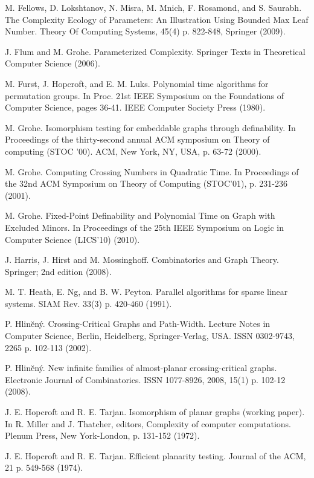 \documentclass[11pt]{report}
\begin{document}
\begin{thebibliography}{9}
M. Fellows, D. Lokshtanov, N. Misra, M. Mnich, F. Rosamond, and S. Saurabh. The Complexity Ecology of Parameters: An Illustration Using Bounded Max Leaf Number. Theory Of Computing Systems, 45(4) p. 822-848, Springer (2009).

J. Flum and M. Grohe. Parameterized Complexity. Springer Texts in Theoretical Computer Science (2006).

M. Furst, J. Hopcroft, and E. M. Luks. Polynomial time algorithms for permutation groups. In Proc. 21st IEEE Symposium on the Foundations of Computer Science, pages 36-41. IEEE Computer Society Press (1980).

M. Grohe. Isomorphism testing for embeddable graphs through definability. In Proceedings of the thirty-second annual ACM symposium on Theory of computing (STOC '00). ACM, New York, NY, USA, p. 63-72 (2000).

M. Grohe. Computing Crossing Numbers in Quadratic Time. In Proceedings of the 32nd ACM Symposium on Theory of Computing (STOC'01), p. 231-236 (2001).

M. Grohe. Fixed-Point Definability and Polynomial Time on Graph with Excluded Minors. In Proceedings of the 25th IEEE Symposium on Logic in Computer Science (LICS'10) (2010).

J. Harris, J. Hirst and M. Mossinghoff. Combinatorics and Graph Theory. Springer; 2nd edition (2008).

M. T. Heath, E. Ng, and B. W. Peyton. Parallel algorithms for sparse linear systems. SIAM Rev. 33(3)  p. 420-460 (1991).

P. Hlin\u{e}n\'{y}. Crossing-Critical Graphs and Path-Width. Lecture Notes in Computer Science, Berlin, Heidelberg, Springer-Verlag, USA. ISSN 0302-9743, 2265 p. 102-113 (2002).

P. Hlin\u{e}n\'{y}. New infinite families of almost-planar crossing-critical graphs. Electronic Journal of Combinatorics. ISSN 1077-8926, 2008, 15(1) p. 102-12 (2008).

J. E. Hopcroft and R. E. Tarjan. Isomorphism of planar graphs (working paper). In R. Miller and J. Thatcher, editors, Complexity of computer computations. Plenum Press, New York-London, p. 131-152 (1972).

J. E. Hopcroft and R. E. Tarjan. Efficient planarity testing. Journal of the ACM, 21 p. 549-568 (1974).


\end{thebibliography}
\end{document}
